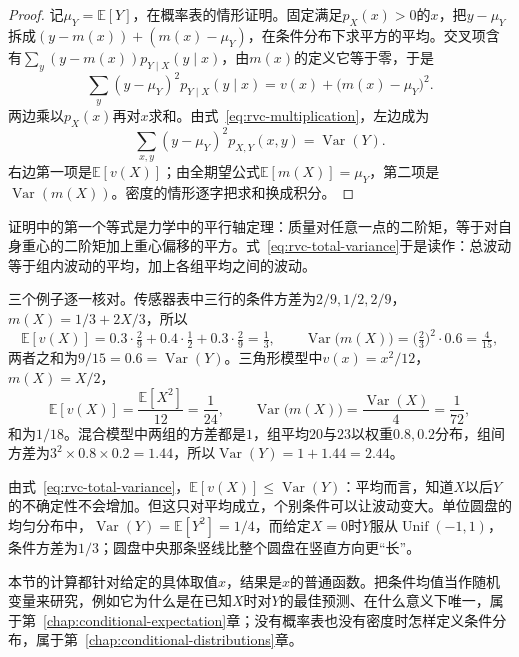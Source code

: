 \begin{proof}
记$\mu_Y=\mathbb{E}[Y]$，在概率表的情形证明。固定满足$p_X(x)>0$的$x$，把$y-\mu_Y$拆成$(y-m(x))+(m(x)-\mu_Y)$，在条件分布下求平方的平均。交叉项含有$\sum_{y}(y-m(x))p_{Y\mid X}(y\mid x)$，由$m(x)$的定义它等于零，于是
\[
 \sum_{y}(y-\mu_Y)^{2}p_{Y\mid X}(y\mid x)=v(x)+\bigl(m(x)-\mu_Y\bigr)^{2}.
\]
两边乘以$p_X(x)$再对$x$求和。由式~\eqref{eq:rvc-multiplication}，左边成为
\[
 \sum_{x,y}(y-\mu_Y)^{2}p_{X,Y}(x,y)=\operatorname{Var}(Y).
\]右边第一项是$\mathbb{E}[v(X)]$；由全期望公式$\mathbb{E}[m(X)]=\mu_Y$，第二项是$\operatorname{Var}(m(X))$。密度的情形逐字把求和换成积分。
\end{proof}

证明中的第一个等式是力学中的平行轴定理：质量对任意一点的二阶矩，等于对自身重心的二阶矩加上重心偏移的平方。式~\eqref{eq:rvc-total-variance}于是读作：总波动等于组内波动的平均，加上各组平均之间的波动。

三个例子逐一核对。传感器表中三行的条件方差为$2/9,1/2,2/9$，$m(X)=1/3+2X/3$，所以
\[
 \mathbb{E}[v(X)]=0.3\cdot\tfrac29+0.4\cdot\tfrac12+0.3\cdot\tfrac29=\tfrac13,\qquad
 \operatorname{Var}\bigl(m(X)\bigr)=\bigl(\tfrac23\bigr)^{2}\cdot0.6=\tfrac{4}{15},
\]
两者之和为$9/15=0.6=\operatorname{Var}(Y)$。三角形模型中$v(x)=x^{2}/12$，$m(X)=X/2$，
\[
 \mathbb{E}[v(X)]=\frac{\mathbb{E}[X^{2}]}{12}=\frac{1}{24},\qquad
 \operatorname{Var}\bigl(m(X)\bigr)=\frac{\operatorname{Var}(X)}{4}=\frac{1}{72},
\]
和为$1/18$。混合模型中两组的方差都是$1$，组平均$20$与$23$以权重$0.8,0.2$分布，组间方差为$3^{2}\times0.8\times0.2=1.44$，所以$\operatorname{Var}(Y)=1+1.44=2.44$。

由式~\eqref{eq:rvc-total-variance}，$\mathbb{E}[v(X)]\leq\operatorname{Var}(Y)$：平均而言，知道$X$以后$Y$的不确定性不会增加。但这只对平均成立，个别条件可以让波动变大。单位圆盘的均匀分布中，$\operatorname{Var}(Y)=\mathbb{E}[Y^{2}]=1/4$，而给定$X=0$时$Y$服从$\operatorname{Unif}(-1,1)$，条件方差为$1/3$；圆盘中央那条竖线比整个圆盘在竖直方向更“长”。

本节的计算都针对给定的具体取值$x$，结果是$x$的普通函数。把条件均值当作随机变量来研究，例如它为什么是在已知$X$时对$Y$的最佳预测、在什么意义下唯一，属于第~\ref{chap:conditional-expectation}章；没有概率表也没有密度时怎样定义条件分布，属于第~\ref{chap:conditional-distributions}章。
